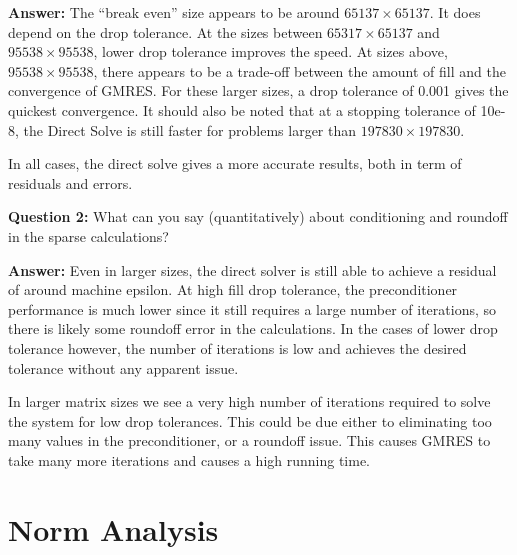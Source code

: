 \documentclass[oneside,final]{amsart}  %
\begin{document}
\textbf{Answer: }The ``break even'' size appears to be around $65137\times65137$.
It does depend on the drop tolerance.
At the sizes between $65317\times65137$ and $95538\times95538$, lower drop tolerance improves the speed.
At sizes above, $95538\times95538$, there appears to be a trade-off between the amount of fill and the convergence of GMRES.
For these larger sizes, a drop tolerance of 0.001 gives the quickest convergence.
It should also be noted that at a stopping tolerance of 10e-8, the Direct Solve is still faster for problems larger than $197830\times197830$.

In all cases, the direct solve gives a more accurate results, both in term of residuals and errors.

\textbf{Question 2: }What can you say (quantitatively) about conditioning and roundoff in the sparse calculations?

\textbf{Answer: }Even in larger sizes, the direct solver is still able to achieve a residual of around machine epsilon.
At high fill drop tolerance, the preconditioner performance is much lower since it still requires a large number of iterations, so there is likely some
roundoff error in the calculations.
In the cases of lower drop tolerance however, the number of iterations is low and achieves the desired tolerance without any apparent issue.

In larger matrix sizes we see a very high number of iterations required to solve the system for low drop tolerances.
This could be due either to eliminating too many values in the preconditioner, or a roundoff issue.
This causes GMRES to take many more iterations and causes a high running time.

\section{Norm Analysis}
\end{document}
